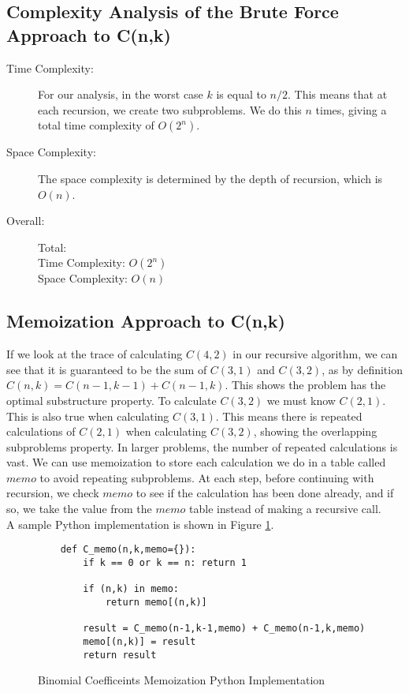 \subsection{Complexity Analysis of the Brute Force Approach to C(n,k)}
\begin{description}
    \item[Time Complexity:]
        For our analysis, in the worst case $k$ is equal to $n/2$.
        This means that at each recursion,
        we create two subproblems.
        We do this $n$ times, giving a total time complexity of $O(2^n)$.

    \item[Space Complexity:] 
        The space complexity is determined by the depth of recursion, which is $O(n)$.

    \item[Overall:] Total:\\
        Time Complexity: $O(2^n)$\\
        Space Complexity: $O(n)$
    
\end{description}

\subsection{Memoization Approach to C(n,k)}
If we look at the trace of calculating $C(4,2)$ in our recursive algorithm, we can see that it is guaranteed to be the sum of $C(3,1)$ and $C(3,2)$, as by definition $C(n,k) = C(n-1,k-1) + C(n-1, k)$.
This shows the problem has the optimal substructure property.
To calculate $C(3,2)$ we must know $C(2,1)$.
This is also true when calculating $C(3,1)$.
This means there is repeated calculations of $C(2,1)$ when calculating $C(3,2)$,
showing the overlapping subproblems property.
In larger problems, the number of repeated calculations is vast.
We can use memoization to store each calculation we do in a table called $memo$ to avoid repeating subproblems.
At each step, before continuing with recursion, we check $memo$ to see if the calculation has been done already, and if so, we take the value from the $memo$ table instead of making a recursive call.\\

A sample Python implementation is shown in Figure \ref{fig:binomial-memo}.

\begin{figure}[H]
    \centering
    \begin{lstlisting}
    def C_memo(n,k,memo={}):
        if k == 0 or k == n: return 1
    
        if (n,k) in memo:
            return memo[(n,k)]
        
        result = C_memo(n-1,k-1,memo) + C_memo(n-1,k,memo)
        memo[(n,k)] = result
        return result
    \end{lstlisting}
    \caption{Binomial Coefficeints Memoization Python Implementation}
    \label{fig:binomial-memo}
\end{figure}

